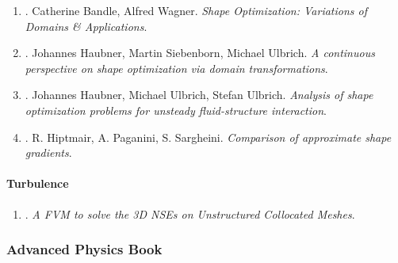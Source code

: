 \documentclass{article}
\begin{document}
\begin{enumerate}
	\item \cite{Bandle_Wagner2023}. Catherine Bandle, Alfred Wagner. {\it Shape Optimization: Variations of Domains \& Applications}.\hfill{\sf[reading]}
	
	\item \cite{Haubner_Siebenborn_Ulbrich2021}. Johannes Haubner, Martin Siebenborn, Michael Ulbrich. {\it A continuous perspective on shape optimization via domain transformations}.\hfill{\sf[done]}
	
	\item \cite{Haubner_Ulbrich_Ulbrich2020}. Johannes Haubner, Michael Ulbrich, Stefan Ulbrich. {\it Analysis of shape optimization problems for unsteady fluid-structure interaction}.\hfill{\sf[done]}
	
	\item \cite{Hiptmair_Paganini_Sargheini2015}. R. Hiptmair, A. Paganini, S. Sargheini. {\it Comparison of approximate shape gradients}.\hfill{\sf[done]}
\end{enumerate}

\paragraph{Turbulence}

\begin{enumerate}
	\item \cite{Perron_Boivin_Herard2004}. {\it A FVM to solve the 3{D} NSEs on Unstructured Collocated Meshes}.\hfill{\sf[reading]}
\end{enumerate}


\subsubsection{Advanced Physics Book}
\end{document}
